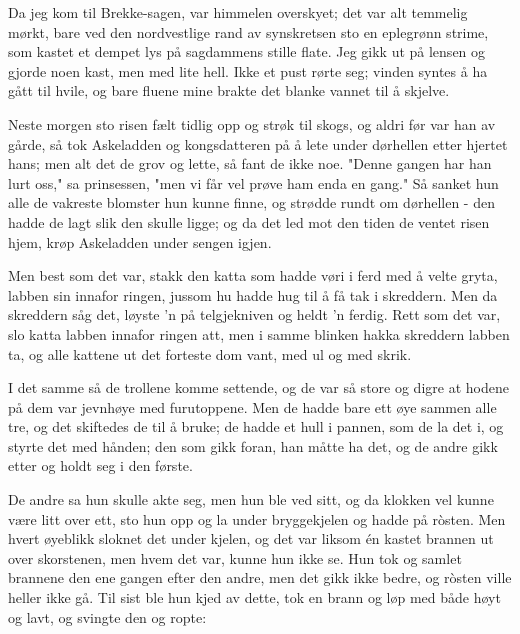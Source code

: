 \documentclass[a4paper]{report}
\begin{document}
\the\pretolerance

\the\tolerance

\the\hbadness

\the\hyphenpenalty

\begin{minipage}{0.5\textwidth}
Da jeg kom til Brekke-sagen, var himmelen overskyet; det var alt temmelig mørkt, bare ved den nordvestlige rand av synskretsen sto en eplegrønn strime, som kastet et dempet lys på sagdammens stille flate. Jeg gikk ut på lensen og gjorde noen kast, men med lite hell. Ikke et pust rørte seg; vinden syntes å ha gått til hvile, og bare fluene mine brakte det blanke vannet til å skjelve.

Neste morgen sto risen fælt tidlig opp og strøk til skogs, og aldri før var han av gårde, så tok Askeladden og kongsdatteren på å lete under dørhellen etter hjertet hans; men alt det de grov og lette, så fant de ikke noe. "Denne gangen har han lurt oss," sa prinsessen, "men vi får vel prøve ham enda en gang." Så sanket hun alle de vakreste blomster hun kunne finne, og strødde rundt om dørhellen - den hadde de lagt slik den skulle ligge; og da det led mot den tiden de ventet risen hjem, krøp Askeladden under sengen igjen.

Men best som det var, stakk den katta som hadde vøri i ferd med å velte gryta, labben sin innafor ringen, jussom hu hadde hug til å få tak i skreddern. Men da skreddern såg det, løyste 'n på telgjekniven og heldt 'n ferdig. Rett som det var, slo katta labben innafor ringen att, men i samme blinken hakka skreddern labben ta, og alle kattene ut det forteste dom vant, med ul og med skrik.

I det samme så de trollene komme settende, og de var så store og digre at hodene på dem var jevnhøye med furutoppene. Men de hadde bare ett øye sammen alle tre, og det skiftedes de til å bruke; de hadde et hull i pannen, som de la det i, og styrte det med hånden; den som gikk foran, han måtte ha det, og de andre gikk etter og holdt seg i den første.




De andre sa hun skulle akte seg, men hun ble ved sitt, og da klokken vel kunne være litt over ett, sto hun opp og la under bryggekjelen og hadde på ròsten. Men hvert øyeblikk sloknet det under kjelen, og det var liksom én kastet brannen ut over skorstenen, men hvem det var, kunne hun ikke se. Hun tok og samlet brannene den ene gangen efter den andre, men det gikk ikke bedre, og ròsten ville heller ikke gå. Til sist ble hun kjed av dette, tok en brann og løp med både høyt og lavt, og svingte den og ropte:


\end{minipage}
\end{document}
